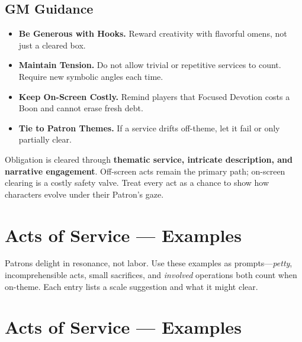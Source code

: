 \subsection{GM Guidance}\label{subsec:obligation-gm}
\begin{itemize}
\item \textbf{Be Generous with Hooks.} Reward creativity with flavorful omens, not just a cleared box.
\item \textbf{Maintain Tension.} Do not allow trivial or repetitive services to count. Require new symbolic angles each time.
\item \textbf{Keep On-Screen Costly.} Remind players that Focused Devotion costs a Boon and cannot erase fresh debt.
\item \textbf{Tie to Patron Themes.} If a service drifts off-theme, let it fail or only partially clear.
\end{itemize}

\begin{tcolorbox}[title={Summary},colback=gray!5,colframe=black]
Obligation is cleared through \textbf{thematic service, intricate description, and narrative engagement}. Off-screen acts remain the primary path; on-screen clearing is a costly safety valve. Treat every act as a chance to show how characters evolve under their Patron’s gaze.\end{tcolorbox}


\section{Acts of Service — Examples}\label{sec:acts-of-service-table}

Patrons delight in resonance, not labor. Use these examples as prompts—\emph{petty}, incomprehensible acts, small sacrifices,  and \emph{involved} operations both count when on-theme. Each entry lists a scale suggestion and what it might clear.


\section{Acts of Service — Examples}\label{sec:acts-of-service-table}

